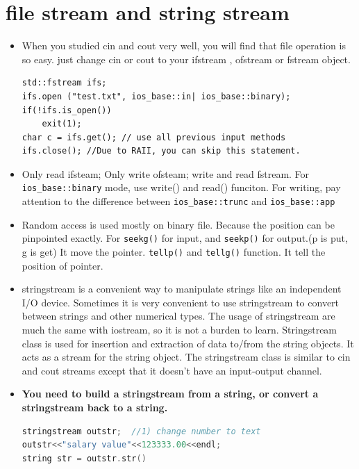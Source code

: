 \documentclass[a4paper,11pt,twoside]{book}
\begin{document}
\section{file stream and string stream}


\begin{itemize}
	\item When you studied cin and cout very well, you will find that file operation is so easy. just change cin or cout to your ifstream , ofstream or fstream object.
	
\begin{lstlisting}[numbers=none]
std::fstream ifs;
ifs.open ("test.txt", ios_base::in| ios_base::binary);
if(!ifs.is_open())
	exit(1);
char c = ifs.get(); // use all previous input methods
ifs.close(); //Due to RAII, you can skip this statement.
\end{lstlisting}
	\item Only read ifsteam;  Only write ofsteam;  write and read fstream.  For \texttt{ios\_base::binary} mode, use write() and read() funciton. For writing, pay attention to the difference between \texttt{ios\_base::trunc} and \texttt{ios\_base::app}
	
	\item Random access is used mostly on binary file. Because the position can be pinpointed exactly. For \texttt{seekg()} for input, and \texttt{seekp()} for output.(p is put, g is get) It move the pointer. \texttt{tellp()} and \texttt{tellg()} function.  It tell the position of pointer.
	
	
	\item stringstream is a convenient way to manipulate strings like an independent I/O device. Sometimes it is very convenient to use stringstream to convert between strings and other numerical types. The usage of stringstream are much the same with iostream, so it is not a burden to learn.  Stringstream class is used for insertion and extraction of data to/from the string objects. It acts as a stream for the string object. The stringstream class is similar to cin and cout streams except that it doesn’t have an input-output channel.
	
	
	\item \textbf{You need to build a stringstream from a string, or convert a stringstream back to a string.}
	
\begin{lstlisting}[frame=single, language=c++]
stringstream outstr;  //1) change number to text
outstr<<"salary value"<<123333.00<<endl;
string str = outstr.str() 
	

\end{lstlisting}
\end{itemize}
\end{document}
